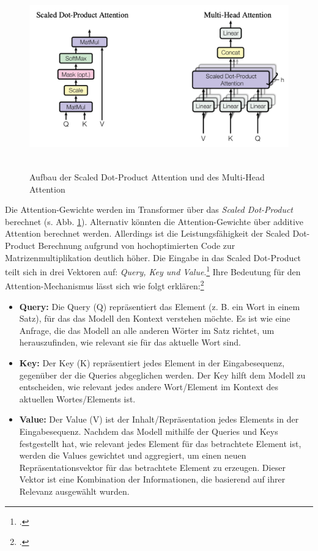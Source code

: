 \begin{figure}[h]
    \centering
    \includegraphics[height=80mm]{graphics/multi-head.png}
    \caption[Aufbau der Scaled Dot-Product Attention und des Multi-Head Attention]{Aufbau der Scaled Dot-Product Attention und des Multi-Head Attention\footnotemark}
    \label{multi-head}
\end{figure}
Die Attention-Gewichte werden im Transformer über das \emph{Scaled Dot-Product} berechnet (s. Abb. \ref{multi-head}). Alternativ könnten die Attention-Gewichte über additive Attention berechnet werden. Allerdings ist die Leistungsfähigkeit der Scaled Dot-Product Berechnung aufgrund von hochoptimierten Code zur Matrizenmultiplikation deutlich höher. Die Eingabe in das Scaled Dot-Product teilt sich in drei Vektoren auf: \emph{Query, Key und Value}.\footcites[Vgl.][S. 3 f.]{vaswani_attention_2017} Ihre Bedeutung für den Attention-Mechanismus lässt sich wie folgt erklären:\footcites[Vgl.][S. 64]{tunstall_natural_2022}

\begin{itemize}
    \item \textbf{Query:} Die Query (Q) repräsentiert das Element (z. B. ein Wort in einem Satz), für das das Modell den Kontext verstehen möchte. Es ist wie eine Anfrage, die das Modell an alle anderen Wörter im Satz richtet, um herauszufinden, wie relevant sie für das aktuelle Wort sind.
    \item \textbf{Key:} Der Key (K) repräsentiert jedes Element in der Eingabesequenz, gegenüber der die Queries abgeglichen werden. Der Key hilft dem Modell zu entscheiden, wie relevant jedes andere Wort/Element im Kontext des aktuellen Wortes/Elements ist.
    \item \textbf{Value:} Der Value (V) ist der Inhalt/Repräsentation jedes Elements in der Eingabesequenz. Nachdem das Modell mithilfe der Queries und Keys festgestellt hat, wie relevant jedes Element für das betrachtete Element ist, werden die Values gewichtet und aggregiert, um einen neuen Repräsentationsvektor für das betrachtete Element zu erzeugen. Dieser Vektor ist eine Kombination der Informationen, die basierend auf ihrer Relevanz ausgewählt wurden.
\end{itemize}

